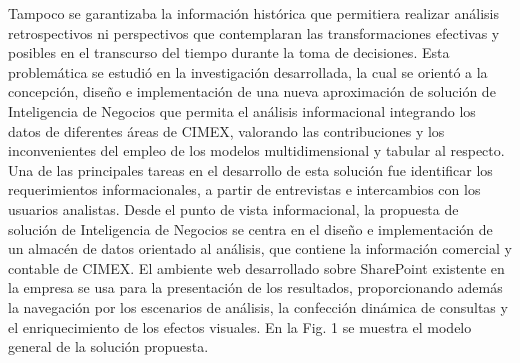 \documentclass[preprint,12pt]{elsarticle}
\begin{document}
Tampoco  se  garantizaba  la información  histórica  que permitiera realizar análisis retrospectivos ni perspectivos que contemplaran las transformaciones efectivas y posibles en el transcurso del tiempo durante la toma de decisiones. Esta problemática se estudió en la investigación desarrollada,  la cual  se orientó  a la  concepción, diseño e implementación  de una  nueva aproximación de solución de Inteligencia de Negocios que permita el análisis informacional integrando los datos de diferentes áreas de CIMEX, valorando las contribuciones y los inconvenientes del empleo de los modelos multidimensional y tabular al respecto. Una de las principales tareas en el desarrollo de esta solución fue identificar los requerimientos informacionales, a partir de entrevistas e intercambios con los usuarios analistas.  Desde el punto de vista informacional, la propuesta de solución de Inteligencia de Negocios se centra en el diseño  e implementación de un  almacén de datos orientado al  análisis, que  contiene la información comercial y contable de CIMEX. El ambiente web desarrollado sobre SharePoint existente en la empresa se usa para la presentación de los resultados, proporcionando además la navegación por los escenarios de análisis, la confección dinámica de consultas y el enriquecimiento de los efectos visuales. En la Fig. 1 se muestra el modelo general de la solución propuesta.
\end{document}
